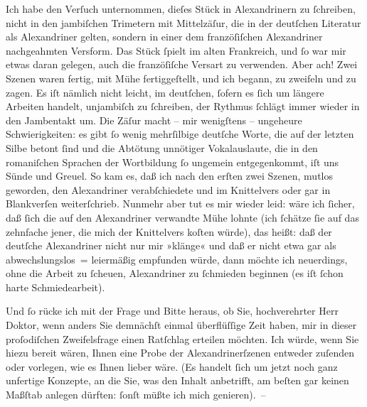 \pstart
           Ich habe den Verſuch unternommen, dieſes Stück in Alexandrinern zu{ }ſchreiben, nicht
               in den jambiſchen Trimetern mit Mittelzäſur, die in der deutſchen Literatur als
               Alexandriner gelten, sondern in einer dem franzöſiſchen Alexandriner nachgeahmten Versform. Das Stück{ }ſpielt im alten
                  Frankreich, und{ }ſo war mir etwas daran
               gelegen, auch die franzöſiſche Versart zu
               verwenden. Aber ach! Zwei Szenen waren fertig, mit Mühe fertiggeſtellt, und ich
               begann, zu zweifeln und zu zagen. Es iſt nämlich nicht leicht, im deutſchen,{ }ſofern
               es{ }ſich um längere Arbeiten handelt, unjambiſch zu{ }ſchreiben, der Rythmus{ }ſchlägt
               immer wieder in den Jambentakt um. Die Zäſur macht – mir wenigſtens – ungeheure
               Schwierigkeiten: es gibt{ }ſo wenig 
               mehrſilbige deutſche Worte, die auf der letzten Silbe betont {\pb}ſind und die Abtötung unnötiger Vokalauslaute, die in
               den romaniſchen Sprachen der Wortbildung{ }ſo ungemein entgegenkommt, iſt uns Sünde und Greuel. So kam es, daß ich nach
               den erſten zwei Szenen, mutlos geworden, den Alexandriner verabſchiedete und im
               Knittelvers oder gar in Blankverſen weiterſchrieb. Nunmehr aber tut es mir wieder
               leid: wäre ich{ }ſicher, daß{ }ſich die auf den Alexandriner verwandte Mühe lohnte (ich{ }ſchätze{ }ſie auf das zehnfache jener, die mich der Knittelvers koſten würde), das
               heißt: daß der deutſche Alexandriner nicht nur mir »klänge« und daß er nicht etwa gar
               als abwechslungslos = leiermäßig empfunden würde, dann möchte ich neuerdings, ohne
               die Arbeit zu{ }ſcheuen, Alexandriner zu{ }ſchmieden beginnen (es iſt{ }ſchon harte
               Schmiedearbeit).\pend
           
\pstart
           Und{ }ſo rücke ich mit der Frage und Bitte heraus, ob Sie, hochverehrter Herr Doktor,
               wenn anders Sie demnächſt einmal überflüſſige Zeit haben, mir {\pb}in dieser proſodiſchen Zweifelsfrage einen Ratſchlag
               erteilen möchten. Ich würde, wenn Sie hiezu bereit wären, Ihnen eine Probe der
               Alexandrinerſzenen entweder zuſenden oder vorlegen, wie es Ihnen lieber wäre. (Es
               handelt{ }ſich um jetzt noch ganz unfertige Konzepte, an die Sie, was den Inhalt
               anbetrifft, am beſten gar keinen Maßſtab anlegen dürften:{ }ſonſt müßte ich mich
               genieren). –\pend
           
